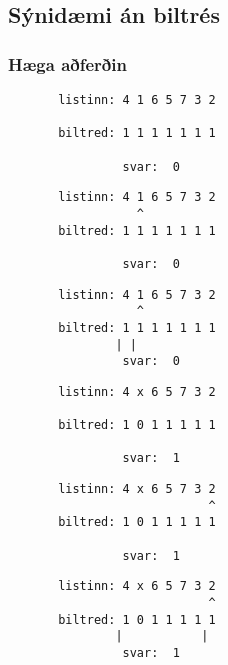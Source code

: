 \subsection{Sýnidæmi án biltrés}
{
    \frametitle{Hæga aðferðin}
}

{ \begin{verbatim}
       listinn: 4 1 6 5 7 3 2

       biltred: 1 1 1 1 1 1 1

                svar:  0
\end{verbatim}}
{ \begin{verbatim}
       listinn: 4 1 6 5 7 3 2
                  ^
       biltred: 1 1 1 1 1 1 1

                svar:  0
\end{verbatim}}
{ \begin{verbatim}
       listinn: 4 1 6 5 7 3 2
                  ^
       biltred: 1 1 1 1 1 1 1
               | |
                svar:  0
\end{verbatim}}
{ \begin{verbatim}
       listinn: 4 x 6 5 7 3 2

       biltred: 1 0 1 1 1 1 1

                svar:  1
\end{verbatim}}
{ \begin{verbatim}
       listinn: 4 x 6 5 7 3 2
                            ^
       biltred: 1 0 1 1 1 1 1

                svar:  1
\end{verbatim}}
{ \begin{verbatim}
       listinn: 4 x 6 5 7 3 2
                            ^
       biltred: 1 0 1 1 1 1 1
               |           |
                svar:  1
\end{verbatim}}
